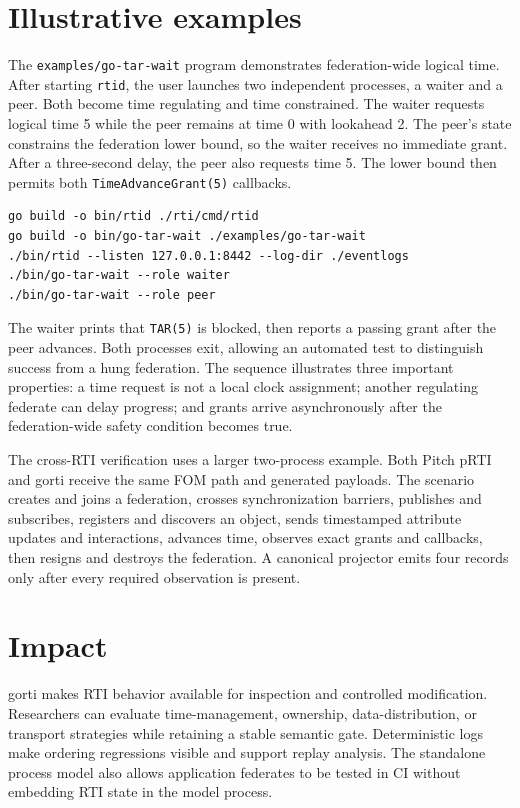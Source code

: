 \documentclass[preprint,12pt,a4paper]{elsarticle}
\begin{document}
\section{Illustrative examples}
\label{sec:example}

The \texttt{examples/go-tar-wait} program demonstrates federation-wide logical
time. After starting \texttt{rtid}, the user launches two independent
processes, a waiter and a peer. Both become time regulating and time
constrained. The waiter requests logical time 5 while the peer remains at time
0 with lookahead 2. The peer's state constrains the federation lower bound, so
the waiter receives no immediate grant. After a three-second delay, the peer
also requests time 5. The lower bound then permits both
\texttt{TimeAdvanceGrant(5)} callbacks.

\begin{verbatim}
go build -o bin/rtid ./rti/cmd/rtid
go build -o bin/go-tar-wait ./examples/go-tar-wait
./bin/rtid --listen 127.0.0.1:8442 --log-dir ./eventlogs
./bin/go-tar-wait --role waiter
./bin/go-tar-wait --role peer
\end{verbatim}

The waiter prints that \texttt{TAR(5)} is blocked, then reports a passing grant
after the peer advances. Both processes exit, allowing an automated test to
distinguish success from a hung federation. The sequence illustrates three
important properties: a time request is not a local clock assignment; another
regulating federate can delay progress; and grants arrive asynchronously after
the federation-wide safety condition becomes true.

The cross-RTI verification uses a larger two-process example. Both Pitch pRTI
and gorti receive the same FOM path and generated payloads. The scenario
creates and joins a federation, crosses synchronization barriers, publishes
and subscribes, registers and discovers an object, sends timestamped attribute
updates and interactions, advances time, observes exact grants and callbacks,
then resigns and destroys the federation. A canonical projector emits four
records only after every required observation is present.

\section{Impact}
\label{sec:impact}

gorti makes RTI behavior available for inspection and controlled modification.
Researchers can evaluate time-management, ownership, data-distribution, or
transport strategies while retaining a stable semantic gate. Deterministic
logs make ordering regressions visible and support replay analysis. The
standalone process model also allows application federates to be tested in CI
without embedding RTI state in the model process.
\end{document}
